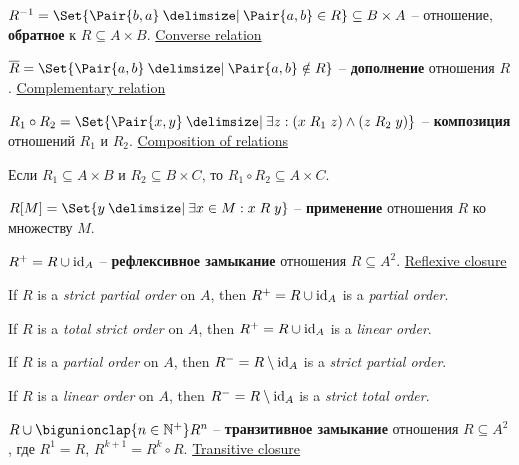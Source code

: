 \documentclass[a4paper,10pt]{article}
\begin{document}
\begin{terms}
    \item $R^{-1} = \Set{\Pair{b,a} \given \Pair{a,b} \in R} \subseteq B \times A$ -- отношение, \textbf{обратное} к $R \subseteq A \times B$.
    \hfill\href{https://en.wikipedia.org/wiki/Converse_relation}{Converse relation}

    \item $\overline{R} = \Set{\Pair{a,b} \given \Pair{a,b} \notin R}$ -- \textbf{дополнение} отношения $R$.
    \hfill\href{https://en.wikipedia.org/wiki/Complement_(set_theory)\#Complementary_relation}{Complementary relation}

    \item $R_1 \circ R_2 = \Set{\Pair{x,y} \given \exists z : (x \rel[R_1] z) \land (z \rel[R_2] y)}$ -- \textbf{композиция} отношений $R_1$ и $R_2$.
    \hfill\href{https://en.wikipedia.org/wiki/Composition_of_relations}{Composition of relations}
    \begin{terms}
        \item Если $R_1 \subseteq A \times B$ и $R_2 \subseteq B \times C$, то $R_1 \circ R_2 \subseteq A \times C$.

    \end{terms}

    \item $R[M] = \Set{y \given \exists x \in M : x \rel y}$ -- \textbf{применение} отношения $R$ ко множеству $M$.

    \item $R^{+} = R \cup \mathrm{id}_{A}$ -- \textbf{рефлексивное замыкание} отношения $R \subseteq A^2$.
    \hfill\href{https://en.wikipedia.org/wiki/Reflexive_closure}{Reflexive closure}
    \begin{terms}
        \item If $R$ is a \emph{strict partial order} on $A$, then $R^{+} = R \cup \mathrm{id}_{A}$ is a \emph{partial order}.

        \item If $R$ is a \emph{total strict order} on $A$, then $R^{+} = R \cup \mathrm{id}_{A}$ is a \emph{linear order}.

        \item If $R$ is a \emph{partial order} on $A$, then $R^{-} = R \setminus \mathrm{id}_{A}$ is a \emph{strict partial order}.

        \item If $R$ is a \emph{linear order} on $A$, then $R^{-} = R \setminus \mathrm{id}_{A}$ is a \emph{strict total order}.
    \end{terms}

    \item $R \union \bigunionclap{n \in \NaturalPlus} R^n$ -- \textbf{транзитивное замыкание} отношения $R \subseteq A^2$, где $R^1 = R$, $R^{k+1} = R^k \circ R$.
    \hfill\href{https://en.wikipedia.org/wiki/Transitive_closure}{Transitive closure}
\end{terms}
\end{document}
